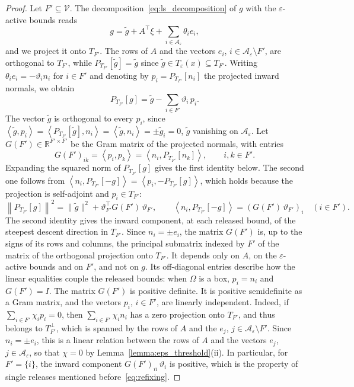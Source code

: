 \documentclass[pdflatex,sn-mathphys-num]{sn-jnl}%
\theoremstyle{thmstyleone}%
\newcommand{\RR}{{\mathbb{R}}} %
\newcommand{\calA}{{\mathcal{A}}}
\newcommand{\inner}[2]{\left\langle {#1} , {#2} \right\rangle} %
\newcommand{\proj}[2]{P_{#1} \left[ {#2} \right]} %
\begin{document}
\begin{proof}
	Let $F' \subseteq \mathcal{V}$. The decomposition~\eqref{eq:ls_decomposition} of $g$ with the $\varepsilon$-active bounds reads
	\[g = \tilde{g} + A^\top\xi + \sum_{i\in\calA_\varepsilon}\theta_ie_i,\]
	and we project it onto $T_{F'}$. The rows of $A$ and the vectors $e_i$, $i \in \calA_\varepsilon\setminus F'$, are orthogonal to $T_{F'}$, while $\proj{T_{F'}}{\tilde{g}} = \tilde{g}$ since $\tilde{g} \in T_\varepsilon(x) \subseteq T_{F'}$. Writing $\theta_ie_i = -\vartheta_in_i$ for $i \in F'$ and denoting by $p_i = \proj{T_{F'}}{n_i}$ the projected inward normals, we obtain
	\[\proj{T_{F'}}{g} = \tilde{g} - \sum_{i\in F'}\vartheta_i\,p_i.\]
	The vector $\tilde{g}$ is orthogonal to every $p_i$, since $\inner{\tilde{g}}{p_i} = \inner{\proj{T_{F'}}{\tilde{g}}}{n_i} = \inner{\tilde{g}}{n_i} = \pm\tilde{g}_i = 0$, $\tilde{g}$ vanishing on $\calA_\varepsilon$. Let $G(F') \in \RR^{F'\times F'}$ be the Gram matrix of the projected normals, with entries
	\[G(F')_{ik} = \inner{p_i}{p_k} = \inner{n_i}{\proj{T_{F'}}{n_k}}, \qquad i,k \in F'.\]
	Expanding the squared norm of $\proj{T_{F'}}{g}$ gives the first identity below. The second one follows from $\inner{n_i}{\proj{T_{F'}}{-g}} = \inner{p_i}{-\proj{T_{F'}}{g}}$, which holds because the projection is self-adjoint and $p_i \in T_{F'}$:
	\begin{equation}\label{eq:gram_expression}
		\left\|\proj{T_{F'}}{g}\right\|^2 = \|\tilde{g}\|^2 + \vartheta_{F'}^\top G(F')\,\vartheta_{F'}, \qquad \inner{n_i}{\proj{T_{F'}}{-g}} = \left(G(F')\,\vartheta_{F'}\right)_i \quad (i \in F').
	\end{equation}
	The second identity gives the inward component, at each released bound, of the steepest descent direction in $T_{F'}$. Since $n_i = \pm e_i$, the matrix $G(F')$ is, up to the signs of its rows and columns, the principal submatrix indexed by $F'$ of the matrix of the orthogonal projection onto $T_{F'}$. It depends only on $A$, on the $\varepsilon$-active bounds and on $F'$, and not on $g$. Its off-diagonal entries describe how the linear equalities couple the released bounds: when $\Omega$ is a box, $p_i = n_i$ and $G(F') = I$. The matrix $G(F')$ is positive definite. It is positive semidefinite as a Gram matrix, and the vectors $p_i$, $i \in F'$, are linearly independent. Indeed, if $\sum_{i\in F'}\chi_ip_i = 0$, then $\sum_{i\in F'}\chi_in_i$ has a zero projection onto $T_{F'}$, and thus belongs to $T_{F'}^\perp$, which is spanned by the rows of $A$ and the $e_j$, $j \in \calA_\varepsilon\setminus F'$. Since $n_i = \pm e_i$, this is a linear relation between the rows of $A$ and the vectors $e_j$, $j \in \calA_\varepsilon$, so that $\chi = 0$ by Lemma~\ref{lemma:eps_threshold}(ii). In particular, for $F' = \{i\}$, the inward component $G(F')_{ii}\,\vartheta_i$ is positive, which is the property of single releases mentioned before~\eqref{eq:refixing}.


\end{proof}
\end{document}

